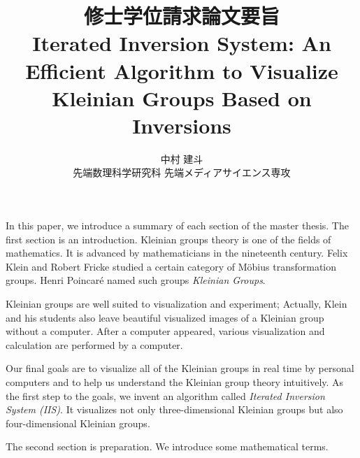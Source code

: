 \documentclass[uplatex, dvipdfmx]{article}
\title{修士学位請求論文要旨\\
 Iterated Inversion System: An Efficient Algorithm to Visualize Kleinian Groups Based on Inversions }
\author{中村 建斗\\
先端数理科学研究科 先端メディアサイエンス専攻\\
}
\date{}
\begin{document}
\maketitle
\pagestyle{plain}
\newpage

In this paper, we introduce a summary of each section of the master thesis.
The first section is an introduction.
Kleinian groups theory is one of the fields of mathematics.
It is advanced by mathematicians in the nineteenth century.
Felix Klein and Robert Fricke studied a certain category of M\"obius
transformation groups.
Henri Poincar\'e named such groups \textit{Kleinian Groups}.

Kleinian groups are well suited to visualization and
experiment; Actually, Klein and his students also leave beautiful
visualized images of a Kleinian group without a computer.
After a computer appeared, various visualization and calculation are
performed by a computer.

Our final goals are to visualize all of the Kleinian groups in real time
by personal computers and to help us understand the Kleinian group theory
intuitively.
As the first step to the goals, we invent an algorithm called
\textit{Iterated Inversion System (IIS)}.
It visualizes not only three-dimensional Kleinian groups but also
four-dimensional Kleinian groups.

The second section is preparation. We introduce some mathematical terms.
\end{document}
